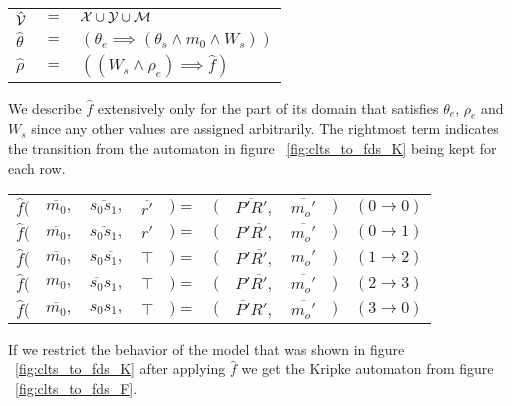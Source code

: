 \vspace{1em}
\begin{tabular}{ l c l }
	$\hat{{\mathcal{V}}}$ & $=$ & ${\mathcal{X}} \cup {\ensuremath{\mathcal{Y}}} \cup \mathcal{M}$\\	
	$\hat{\theta}$ & $=$ & $(\theta_e \implies (\theta_s \wedge m_0 \wedge W_s))$\\
	$\hat{\rho}$ & $=$ & $((W_s \wedge \rho_e) \implies \hat{f})$\\	
\end{tabular}
\vspace{1em}

We describe $\hat{f}$ extensively only for the part of its domain that satisfies $\theta_e$, $\rho_e$ and $W_s$ since any other values are assigned arbitrarily. The rightmost term indicates the transition from the automaton in figure ~\ref{fig:clts_to_fds_K} being kept for each row.

\vspace{1em}
\begin{tabular}{ r r r l l r r l l r}
	$\hat{f}($ & $\overline{m_0},$ & $\overline{s_0 s_1},$ &$\overline{r'}$ & $) =$ & $($ & $\overline{P'R'},$ & $\overline{m_o'}$ & $)$ & $(0 \rightarrow 0)$\\
	$\hat{f}($ & $\overline{m_0},$ & $\overline{s_0 s_1},$ &$r'$ & $) =$ & $($ & $P'\overline{R'},$ & $\overline{m_o'}$ & $)$ & $(0 \rightarrow 1)$\\	
	$\hat{f}($ & $\overline{m_0},$ & $s_0\overline{s_1},$ &$\top$ & $) =$ & $($ & $P'\overline{R'},$ & $m_o'$ & $)$ & $(1 \rightarrow 2)$\\	
	$\hat{f}($ & $m_0,$ & $\overline{s_0} s_1,$ &$\top$ & $) =$ & $($ & $P'\overline{R'},$ & $\overline{m_o'}$ & $)$ & $(2 \rightarrow 3)$\\	
	$\hat{f}($ & $\overline{m_0},$ & $s_0 s_1,$ &$\top$ & $) =$ & $($ & $\overline{P'}R',$ & $\overline{m_o'}$ & $)$ & $(3 \rightarrow 0)$\\	
\end{tabular}
\vspace{1em}



If we restrict the behavior of the model that was shown in figure ~\ref{fig:clts_to_fds_K} after applying $\hat{f}$ we get the Kripke automaton from figure  ~\ref{fig:clts_to_fds_F}.

